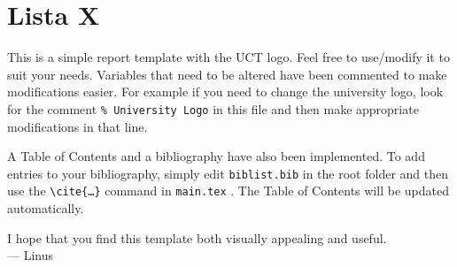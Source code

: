 \documentclass[12pt]{article}
\begin{document}
\section{Lista X}
This is a simple report template with the UCT logo. Feel free to use/modify it to suit your needs. Variables that need to be altered have been commented to make modifications easier. For example if you need to change the university logo, look for the comment \texttt{\% University Logo} in this file and then make appropriate modifications in that line.

A Table of Contents and a bibliography have also been implemented. To add entries to your bibliography, simply edit \texttt{biblist.bib} in the root folder and then use the \texttt{\textbackslash cite\{\ldots\}} command in \texttt{main.tex} \cite{bibtex}. The Table of Contents will be updated automatically.

I hope that you find this template both visually appealing and useful. \\

\hspace{1 cm}--- Linus

\newpage


\end{document}
